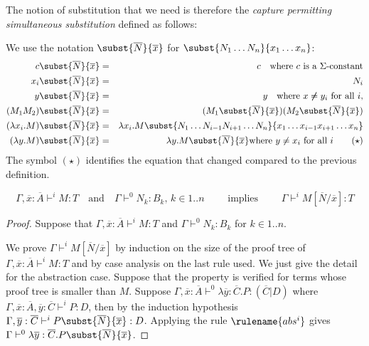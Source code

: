 The notion of substitution that we need is therefore
the \emph{capture permitting simultaneous substitution} defined as follows:

\begin{dfn}
 We use the notation
$\subst{\overline{N}}{\overline{x}}$ for $\subst{N_1 \ldots N_n}{x_1
\ldots x_n}$:
\begin{eqnarray*}
c \subst{\overline{N}}{\overline{x}} &=& c \quad \mbox{where $c$ is a $\Sigma$-constant}\\
 x_i \subst{\overline{N}}{\overline{x}} &=& N_i\\
 y \subst{\overline{N}}{\overline{x}} &=& y \quad \mbox{where } x \not \neq y_i \mbox{ for all } i,\\
(M_1 M_2) \subst{\overline{N}}{\overline{x}} &=& (M_1 \subst{\overline{N}}{\overline{x}}) (M_2 \subst{\overline{N}}{\overline{x}})\\
(\lambda x_i . M) \subst{\overline{N}}{\overline{x}} &=& \lambda x_i . M
\subst{N_1 \ldots N_{i-1} N_{i+1}\ldots N_n}{x_1 \ldots x_{i-1} x_{i+1}\ldots x_n} \\
(\lambda y . M) \subst{\overline{N}}{\overline{x}} &=& \lambda y . M \subst{\overline{N}}{\overline{x}} \mbox{where $y \not = x_i$ for all $i$}
\qquad \mathbf{(\star)}
\end{eqnarray*}
The symbol $\mathbf{(\star)}$ identifies the equation that changed compared to the previous definition.
\end{dfn}

\begin{lem}
\label{va_lem:subst_preserve_i}
$$ \Gamma,\overline{x} : \overline{A}\vdash^i M : T
\quad \mbox{and} \quad \Gamma \vdash^0 N_k : B_k \mbox{, } k \in
1..n \qquad \mbox{ implies } \qquad \Gamma \vdash^i
M[\overline{N}/\overline{x}] : T$$
\end{lem}

\begin{proof}
Suppose that $\Gamma,\overline{x}: \overline{A} \vdash^i M :T$ and
$\Gamma \vdash^0 N_k : B_k$ for $k \in 1..n$.

We prove $\Gamma \vdash^i M[\overline{N}/\overline{x}]$ by induction
on the size of the proof tree of $\Gamma,\overline{x}:\overline{A}
\vdash^i M : T$ and by case analysis on the last rule used. We just
give the detail for the abstraction case. Suppose that the property
is verified for terms whose proof tree is smaller than $M$. Suppose
$\Gamma,\overline{x}:\overline{A} \vdash^0 \lambda \overline{y} :
\overline{C}. P : (\overline{C}|D)$ where $\Gamma,
\overline{x}:\overline{A}, \overline{y}:\overline{C} \vdash^i P :
D$, then by the induction hypothesis $\Gamma,
\overline{y}:\overline{C} \vdash^i
P\subst{\overline{N}}{\overline{x}} : D$. Applying the rule
$\rulename{abs^i}$ gives $\Gamma \vdash^0 \lambda
\overline{y}:\overline{C} . P \subst{\overline{N}}{\overline{x}}$.
\end{proof}


